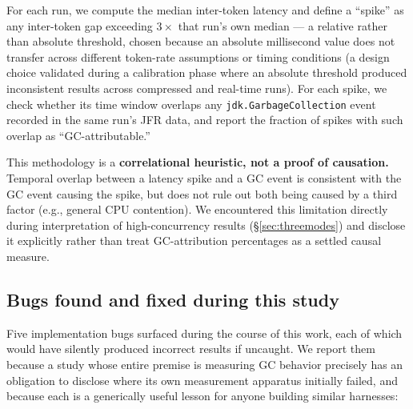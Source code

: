 \documentclass[11pt]{article}
\newcommand{\code}[1]{\texttt{#1}}
\begin{document}
For each run, we compute the median inter-token latency and define a ``spike'' as any inter-token
gap exceeding $3\times$ that run's own median --- a relative rather than absolute threshold,
chosen because an absolute millisecond value does not transfer across different token-rate
assumptions or timing conditions (a design choice validated during a calibration phase where an
absolute threshold produced inconsistent results across compressed and real-time runs). For each
spike, we check whether its time window overlaps any \code{jdk.GarbageCollection} event recorded
in the same run's JFR data, and report the fraction of spikes with such overlap as
``GC-attributable.''

This methodology is a \textbf{correlational heuristic, not a proof of causation.} Temporal
overlap between a latency spike and a GC event is consistent with the GC event causing the
spike, but does not rule out both being caused by a third factor (e.g., general CPU contention).
We encountered this limitation directly during interpretation of high-concurrency results
(\S\ref{sec:threemodes}) and disclose it explicitly rather than treat GC-attribution percentages
as a settled causal measure.

\subsection{Bugs found and fixed during this study}
\label{sec:bugs}

Five implementation bugs surfaced during the course of this work, each of which would have
silently produced incorrect results if uncaught. We report them because a study whose entire
premise is measuring GC behavior precisely has an obligation to disclose where its own
measurement apparatus initially failed, and because each is a generically useful lesson for
anyone building similar harnesses:
\end{document}
